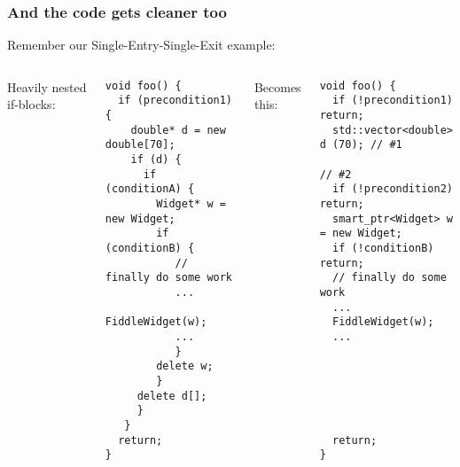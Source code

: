 \begin{frame}[fragile,t]
\frametitle{And the code gets cleaner too}
Remember our Single-Entry-Single-Exit example:
\vskip 6pt
\begin{columns}[t]
Heavily nested if-blocks:
{\scriptsize\begin{verbatim}
void foo() {
  if (precondition1) {
    double* d = new double[70];
    if (d) {
      if (conditionA) {
        Widget* w = new Widget;
        if (conditionB) {
           // finally do some work
           ...
           FiddleWidget(w);
           ...
           }
        delete w;
        }
     delete d[];
     }
   }
  return;
}
\end{verbatim}}
\pause{}
Becomes this:
{\scriptsize\begin{verbatim}
void foo() {
  if (!precondition1)  return;
  std::vector<double> d (70); // #1
                              // #2
  if (!precondition2) return;
  smart_ptr<Widget> w = new Widget;
  if (!conditionB) return;
  // finally do some work
  ...
  FiddleWidget(w);
  ...






  return;
}
\end{verbatim}}
\end{columns}
\pause{}
\vskip 6pt
\end{frame}
